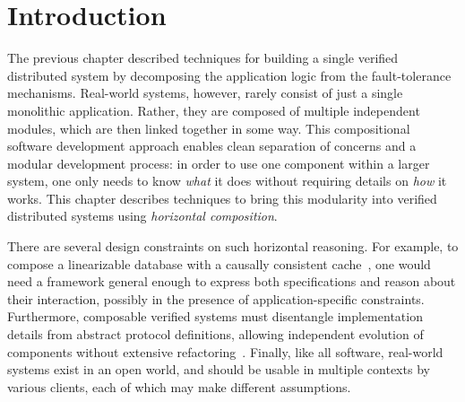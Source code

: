 \newcommand{\stat}{\kappa}
\newcommand{\done}{\mathsf{done}}
\newcommand{\tagi}{\mathit{tag}}
\newcommand{\prei}{\mathit{pre}}
\newcommand{\stepi}{\mathit{step}}

\newcommand{\pinit}{\mathsf{PInit}}
\newcommand{\pgotreq}{\mathsf{PGotRequest}}
\newcommand{\pyes}{\mathsf{PRespYes}}
\newcommand{\pcommit}{\mathsf{PCommit}}
\newcommand{\pabort}{\mathsf{PAbort}}

\newcommand{\cinit}{\mathsf{CInit}}
\newcommand{\csendprep}{\mathsf{CSendPrep}}
\newcommand{\cwaitprep}{\mathsf{CWaitPrepResp}}
\newcommand{\csendcommit}{\mathsf{CSendCommit}}
\newcommand{\csendabort}{\mathsf{CSendAbort}}
\newcommand{\cwaitcommit}{\mathsf{CWaitCommitAck}}
\newcommand{\cwaitabort}{\mathsf{CWaitAbortAck}}

\newcommand{\spa}{\phantom{zz}}
\newcommand{\spb}{\phantom{zzzz}}
\newcommand{\code}[1]{\lstinline[style=Coq, basicstyle=\small\ttfamily]{#1}}
\newcommand{\fld}{\#}

\newcommand{\SendEffect}{\mathsf{Sent}}
\newcommand{\ReceiveEffect}{\mathsf{Received}}


\section{Introduction}
\label{sec:intro}

The previous chapter described techniques for building
  a single verified distributed system
  by decomposing the application logic from the fault-tolerance mechanisms.
Real-world systems, however, rarely consist of just a single monolithic application.
%
Rather, they are composed of multiple independent modules, which are
then linked together in some way.
%
This compositional software development approach enables clean separation of concerns and
a modular development process: in order to use one component within a
larger system, one only needs to know \emph{what} it does without
requiring details on \emph{how} it works.
%
This chapter describes techniques to bring this modularity into verified distributed systems
  using \emph{horizontal composition}.

There are several design constraints on such horizontal reasoning.
%
For example, to compose a linearizable database with a causally
consistent cache~\cite{Ahamad-al:DC95}, one would need a framework
general enough to express both specifications and reason about their
interaction, possibly in the presence of application-specific
constraints.
%
Furthermore, composable verified systems must disentangle implementation details
from abstract protocol definitions, allowing independent evolution of components
without extensive refactoring~\cite{Woos-al:CPP16}.
%
Finally, like all software, real-world systems exist in an open world,
and should be usable in multiple contexts by various clients, each of
which may make different assumptions.

